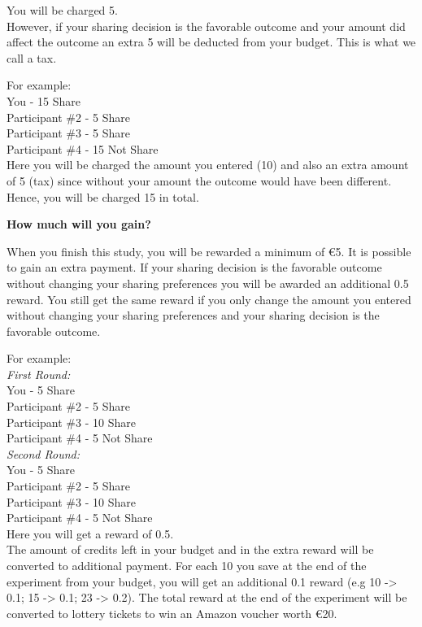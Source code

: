 You will be charged 5. \\

However, if your sharing decision is the favorable outcome and your amount did affect the outcome an extra 5 will be deducted from your budget. This is what we call a tax.

For example: \\

You - 15 Share \\
\indent Participant \#2 - 5 Share \\
\indent Participant \#3 - 5 Share \\
\indent Participant \#4 - 15 Not Share \\

Here you will be charged the amount you entered (10) and also an extra amount of 5 (tax) since without your amount the outcome would have been different. Hence, you will be charged 15 in total.

\textbf{How much will you gain?}

When you finish this study, you will be rewarded a minimum of €5. It is possible to gain an extra payment. If your sharing decision is the favorable outcome without changing your sharing preferences you will be awarded an additional 0.5 reward. You still get the same reward if you only change the amount you entered without changing your sharing preferences and your sharing decision is the favorable outcome.

For example: \\

\textit{First Round:} \\

You - 5 Share \\
\indent Participant \#2 - 5 Share \\
\indent Participant \#3 - 10 Share \\
\indent Participant \#4 - 5 Not  Share \\

\textit{Second Round:} \\

You - 5 Share \\
\indent Participant \#2 - 5 Share \\
\indent Participant \#3 - 10 Share \\
\indent Participant \#4 - 5 Not  Share \\

Here you will get a reward of 0.5. \\

The amount of credits left in your budget and in the extra reward will be converted to additional payment. For each 10 you save at the end of the experiment from your budget, you will get an additional 0.1 reward (e.g 10 -> 0.1; 15 -> 0.1; 23 -> 0.2). The total reward at the end of the experiment will be converted to lottery tickets to win an Amazon voucher worth €20.















